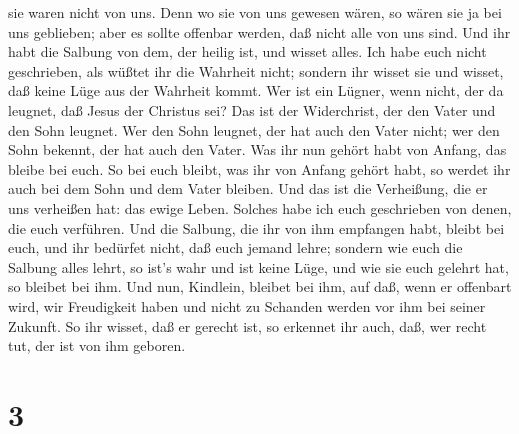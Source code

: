 sie waren nicht von uns. Denn wo sie von uns gewesen wären, so wären sie
ja bei uns geblieben; aber es sollte offenbar werden, daß nicht alle von
uns sind.  Und ihr habt die Salbung von dem, der heilig
ist, und wisset alles.  Ich habe euch nicht geschrieben,
als wüßtet ihr die Wahrheit nicht; sondern ihr wisset sie und wisset,
daß keine Lüge aus der Wahrheit kommt.  Wer ist ein Lügner,
wenn nicht, der da leugnet, daß Jesus der Christus sei? Das ist der
Widerchrist, der den Vater und den Sohn leugnet.  Wer den
Sohn leugnet, der hat auch den Vater nicht; wer den Sohn bekennt, der
hat auch den Vater.  Was ihr nun gehört habt von Anfang,
das bleibe bei euch. So bei euch bleibt, was ihr von Anfang gehört habt,
so werdet ihr auch bei dem Sohn und dem Vater bleiben.  Und
das ist die Verheißung, die er uns verheißen hat: das ewige Leben.
 Solches habe ich euch geschrieben von denen, die euch
verführen.  Und die Salbung, die ihr von ihm empfangen
habt, bleibt bei euch, und ihr bedürfet nicht, daß euch jemand lehre;
sondern wie euch die Salbung alles lehrt, so ist's wahr und ist keine
Lüge, und wie sie euch gelehrt hat, so bleibet bei ihm. 
Und nun, Kindlein, bleibet bei ihm, auf daß, wenn er offenbart wird, wir
Freudigkeit haben und nicht zu Schanden werden vor ihm bei seiner
Zukunft.  So ihr wisset, daß er gerecht ist, so erkennet
ihr auch, daß, wer recht tut, der ist von ihm geboren.

\hypertarget{section-2}{%
\section{3}\label{section-2}}

